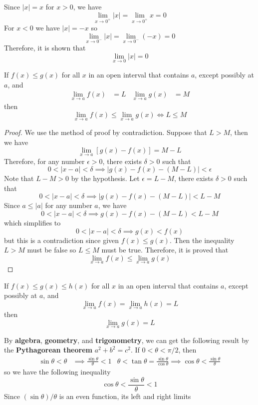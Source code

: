 \begin{solution}
    Since \(|x|=x\) for \(x>0\), we have
    \[\lim_{x\to 0^+}|x|=\lim_{x\to 0^+}x=0\]
    For \(x<0\) we have \(|x|=-x\) so
    \[\lim_{x\to 0^-}|x|=\lim_{x\to 0^-}(-x)=0\]
    Therefore, it is shown that \[\lim_{x\to 0}|x|=0\]
\end{solution}
\begin{theorem}
    If \(f(x)\leq g(x)\) for all \(x\) in an open interval that contains \(a\),
    except possibly at \(a\), and
    \begin{align*}
        \lim_{x\to a}f(x)&=L&\lim_{x\to a}g(x)&=M
    \end{align*}
    then \[\lim_{x\to a}f(x)\leq\lim_{x\to a}g(x)\iff L\leq M\]
\end{theorem}
\begin{proof}
    We use the method of proof by contradiction.
    Suppose  that \(L>M\), then we have
    \[\lim_{x\to a}[g(x)-f(x)]=M-L\]
    Therefore, for any number \(\epsilon>0\), there exists \(\delta>0\) such that
    \[0<|x-a|<\delta\implies|g(x)-f(x)-(M-L)|<\epsilon\]
    Note that \(L-M>0\) by the hypothesis.
    Let \(\epsilon=L-M\), there exists \(\delta>0\) such that
    \[0<|x-a|<\delta\implies|g(x)-f(x)-(M-L)|<L-M\]
    Since \(a\leq|a|\) for any number \(a\), we have
    \[0<|x-a|<\delta\implies g(x)-f(x)-(M-L)<L-M\]
    which simplifies to
    \[0<|x-a|<\delta\implies g(x)<f(x)\]
    but this is a contradiction since given \(f(x)\leq g(x)\).
    Then the inequality \(L>M\) must be false so \(L\leq M\) must be true.
    Therefore, it is proved that
    \[\lim_{x\to a}f(x)\leq\lim_{x\to a}g(x)\]
\end{proof}
\begin{theorem}
    If \(f(x)\leq g(x)\leq h(x)\) for all \(x\) in an open interval that
    contains \(a\), except possibly at \(a\), and
    \[\lim_{x\to a}f(x)=\lim_{x\to a}h(x)=L\] then \[\lim_{x\to a}g(x)=L\]
\end{theorem}
By \textbf{algebra}, \textbf{geometry}, and \textbf{trigonometry}, we can get
the following result by the \textbf{Pythagorean theorem} \(a^2+b^2=c^2\).
If \(0<\theta<\pi/2\), then
\begin{align*}
    \sin\theta<\theta&\implies\frac{\sin\theta}{\theta}<1
    &\theta<\tan\theta=\frac{\sin\theta}{\cos\theta}\implies\cos\theta
    <\frac{\sin\theta}{\theta}
\end{align*}
so we have the following inequality
\[\cos\theta<\frac{\sin\theta}{\theta}<1\]
Since \((\sin\theta)/\theta\) is an even function, its left and right limits

